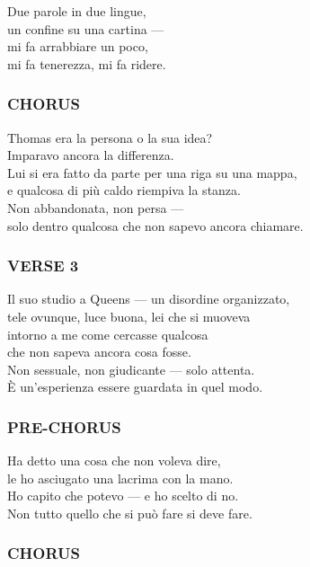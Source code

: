 Due parole in due lingue,\\
un confine su una cartina ---\\
mi fa arrabbiare un poco,\\
mi fa tenerezza, mi fa ridere.

\subsubsection{CHORUS}\label{chorus-37}

Thomas era la persona o la sua idea?\\
Imparavo ancora la differenza.\\
Lui si era fatto da parte per una riga su una mappa,\\
e qualcosa di più caldo riempiva la stanza.\\
Non abbandonata, non persa ---\\
solo dentro qualcosa che non sapevo ancora chiamare.

\subsubsection{VERSE 3}\label{verse-3-8}

Il suo studio a Queens --- un disordine organizzato,\\
tele ovunque, luce buona, lei che si muoveva\\
intorno a me come cercasse qualcosa\\
che non sapeva ancora cosa fosse.\\
Non sessuale, non giudicante --- solo attenta.\\
È un'esperienza essere guardata in quel modo.

\subsubsection{PRE-CHORUS}\label{pre-chorus-27}

Ha detto una cosa che non voleva dire,\\
le ho asciugato una lacrima con la mano.\\
Ho capito che potevo --- e ho scelto di no.\\
Non tutto quello che si può fare si deve fare.

\subsubsection{CHORUS}\label{chorus-38}

